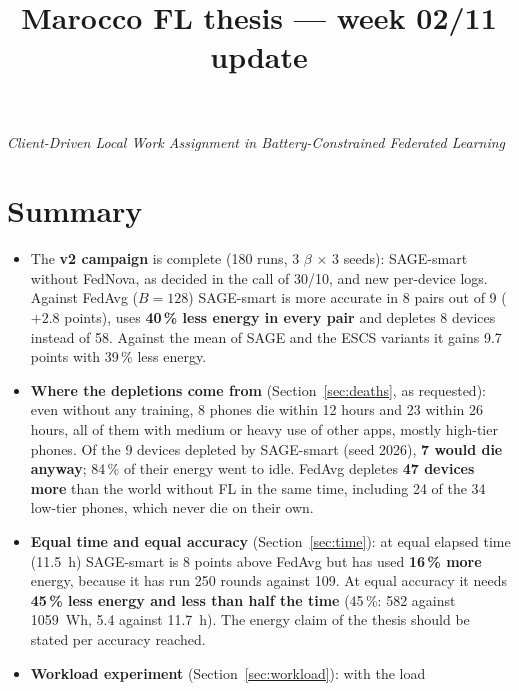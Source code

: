 \documentclass[11pt,a4paper]{article}
\title{\bfseries Marocco FL thesis --- week 02/11 update}
\author{}
\date{}
\begin{document}
\maketitle
\vspace{-3.2em}
\begin{center}
\emph{Client-Driven Local Work Assignment in Battery-Constrained Federated Learning}
\end{center}
\vspace{1em}

\section*{Summary}

\begin{itemize}
  \item The \textbf{v2 campaign} is complete (180 runs, 3 $\beta$ $\times$ 3 seeds):
        SAGE-smart without FedNova, as decided in the call of 30/10, and new
        per-device logs. Against FedAvg ($B=128$) SAGE-smart is more accurate in
        8 pairs out of 9 ($+2.8$ points), uses \textbf{40\,\% less energy in every
        pair} and depletes 8 devices instead of 58. Against the mean of SAGE and
        the ESCS variants it gains 9.7 points with 39\,\% less energy.
  \item \textbf{Where the depletions come from} (Section~\ref{sec:deaths}, as
        requested): even without any training, 8 phones die within 12 hours and
        23 within 26 hours, all of them with medium or heavy use of other apps,
        mostly high-tier phones.
        Of the 9 devices depleted by SAGE-smart (seed 2026), \textbf{7 would die
        anyway}; 84\,\% of their energy went to idle. FedAvg depletes
        \textbf{47 devices more} than the world without FL in the same time,
        including 24 of the 34 low-tier phones, which never die on their own.
  \item \textbf{Equal time and equal accuracy} (Section~\ref{sec:time}): at
        equal elapsed time (11.5~h) SAGE-smart is 8 points above FedAvg but has
        used \textbf{16\,\% more} energy, because it has run 250 rounds against
        109. At equal accuracy it needs \textbf{45\,\% less energy and less than
        half the time} (45\,\%: 582 against 1059~Wh, 5.4 against 11.7~h). The
        energy claim of the thesis should be stated per accuracy reached.
  \item \textbf{Workload experiment} (Section~\ref{sec:workload}): with the load

\end{itemize}
\end{document}
